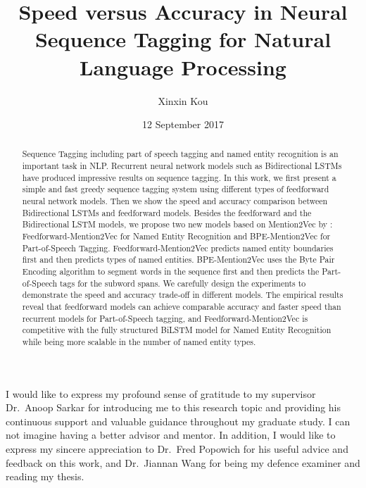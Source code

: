 \documentclass{sfuthesis}
\title{Speed versus Accuracy in Neural Sequence Tagging for Natural Language Processing}
\author{Xinxin Kou}
\date{12 September 2017}
\newcommand{\ma}{Feedforward-Mention2Vec}
\newcommand{\mb}{BPE-Mention2Vec}
\begin{document}
\frontmatter
\maketitle{}

\begin{abstract}
Sequence Tagging including part of speech tagging and named entity recognition is an important task in NLP. Recurrent neural network models such as Bidirectional LSTMs have produced impressive results on sequence tagging. In this work, we first present a simple and fast greedy sequence tagging system using different types of feedforward neural network models. Then we show the speed and accuracy comparison between Bidirectional LSTMs and feedforward models. Besides the feedforward and the Bidirectional LSTM models, we propose two new models based on Mention2Vec by \cite{stratos2016mention2vec}: \ma{} for Named Entity Recognition and \mb{} for Part-of-Speech Tagging. \ma{} predicts named entity boundaries first and then predicts types of named entities. \mb{} uses the Byte Pair Encoding algorithm to segment words in the sequence first and then predicts the Part-of-Speech tags for the subword spans. We carefully design the experiments to demonstrate the speed and accuracy trade-off in different models. The empirical results reveal that feedforward models can achieve comparable accuracy and faster speed than recurrent models for Part-of-Speech tagging, and \ma{} is competitive with the fully structured BiLSTM model for Named Entity Recognition while being more scalable in the number of named entity types.

\end{abstract}


\begin{acknowledgements} %

I would like to express my profound sense of gratitude to my supervisor Dr.\ Anoop Sarkar for introducing me to this research
topic and providing his continuous support and valuable guidance throughout my graduate study. I can not imagine having a better advisor and mentor. In addition, I would like to express my sincere appreciation to Dr.\ Fred Popowich for his useful advice and feedback on this work, and Dr.\ Jiannan Wang for being my defence examiner and reading my thesis.




\end{acknowledgements}

\tableofcontents\clearpage
{}\listoftables\clearpage
{}\listoffigures
\end{document}
